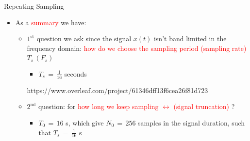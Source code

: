 \documentclass{beamer}
\begin{document}
\begin{frame}[t,allowframebreaks]{Repeating Sampling}
\begin{itemize}
\item As a \textcolor{red}{summary} we have:

\begin{itemize}

\item $\mathrm{1}^\mathrm{st}$ question we ask since the signal $x(t)$ isn't band limited in the frequency domain: \textcolor{red}{how do we choose the sampling period (sampling rate)} $T_s \, (F_s)$

	\begin{itemize}
	\item $T_s \, = \, \displaystyle\frac{1}{16}$ seconds
	\end{itemize}
https://www.overleaf.com/project/61346dff13f6cea26f81d723	
\item $\mathrm{2}^\mathrm{nd}$ question: for \textcolor{red}{how long we keep sampling $\leftrightarrow$ (signal truncation)} ?

	\begin{itemize}
	\item $T_0 \, = \, 16$ s, which give $N_0 \, = \, 256$ samples in the signal duration,
	such that $T_s \, = \, \displaystyle\frac{1}{16}$ s
	\end{itemize}

\end{itemize}


\end{itemize}


\end{frame}
\end{document}
